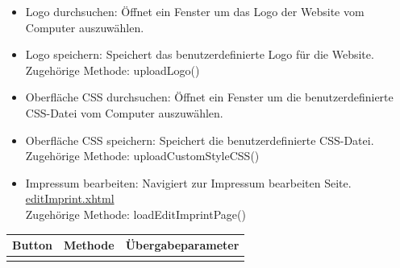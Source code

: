 \begin{itemize}
\begin{itemize}
				\item Logo durchsuchen: Öffnet ein Fenster um das Logo der Website vom Computer auszuwählen.
				\item Logo speichern: Speichert das benutzerdefinierte Logo für die Website. \\ Zugehörige Methode: uploadLogo()
				\item Oberfläche CSS durchsuchen: Öffnet ein Fenster um die benutzerdefinierte CSS-Datei vom Computer auszuwählen. 
				\item Oberfläche CSS speichern: Speichert die benutzerdefinierte CSS-Datei. \\ Zugehörige Methode: uploadCustomStyleCSS()
				\item Impressum bearbeiten: Navigiert zur Impressum bearbeiten Seite. \hyperlink{editImprint}{editImprint.xhtml} \\ Zugehörige Methode: loadEditImprintPage()
			\end{itemize}
			\begin{center}
				\begin{longtable}{|p{4cm} |p{6cm} | p{4cm}|}
						
					\hline \multicolumn{1}{|c|}{\textbf{Button}} & \multicolumn{1}{|c|}{\textbf{Methode}} & \multicolumn{1}{|c|}{\textbf{\"{U}bergabeparameter}} \\ \hline
					\endfirsthead
					\hline
					\endlastfoot
			

\end{longtable}
\end{center}
\end{itemize}
